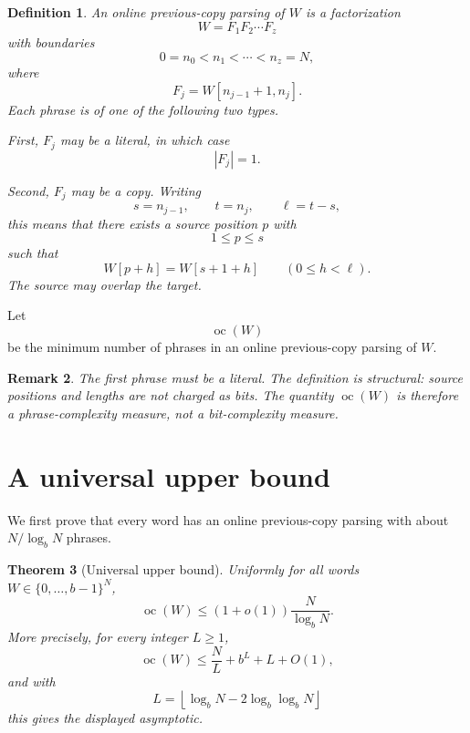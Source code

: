 \documentclass[11pt]{amsart}
\newtheorem{theorem}{Theorem}[section]
\newtheorem{definition}[theorem]{Definition}
\newtheorem{remark}[theorem]{Remark}
\DeclareMathOperator{\oc}{oc}
\begin{document}
\begin{definition}
An online previous-copy parsing of $W$ is a factorization
\[
W=F_1F_2\cdots F_z
\]
with boundaries
\[
0=n_0<n_1<\cdots<n_z=N,
\]
where
\[
F_j=W[n_{j-1}+1,n_j].
\]
Each phrase is of one of the following two types.

First, $F_j$ may be a literal, in which case
\[
|F_j|=1.
\]

Second, $F_j$ may be a copy. Writing
\[
s=n_{j-1},
\qquad
 t=n_j,
\qquad
\ell=t-s,
\]
this means that there exists a source position $p$ with
\[
1\leq p\leq s
\]
such that
\[
W[p+h]=W[s+1+h]
\qquad
(0\leq h<\ell).
\]
The source may overlap the target.
\end{definition}

Let
\[
\oc(W)
\]
be the minimum number of phrases in an online previous-copy parsing of $W$.

\begin{remark}
The first phrase must be a literal. The definition is structural: source positions and lengths are not charged as bits. The quantity $\oc(W)$ is therefore a phrase-complexity measure, not a bit-complexity measure.
\end{remark}

\section{A universal upper bound}

We first prove that every word has an online previous-copy parsing with about $N/\log_b N$ phrases.

\begin{theorem}[Universal upper bound]
Uniformly for all words $W\in\{0,\ldots,b-1\}^N$,
\[
\oc(W)
\leq
(1+o(1))\frac{N}{\log_b N}.
\]
More precisely, for every integer $L\geq1$,
\[
\oc(W)
\leq
\frac{N}{L}+b^L+L+O(1),
\]
and with
\[
L=\left\lfloor \log_b N-2\log_b\log_b N\right\rfloor
\]
this gives the displayed asymptotic.
\end{theorem}
\end{document}
